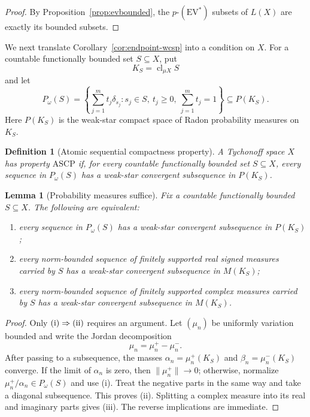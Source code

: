 \documentclass[11pt]{article}
\newtheorem{lemma}[theorem]{Lemma}
\newtheorem{definition}[theorem]{Definition}
\newcommand{\cl}{\operatorname{cl}}
\newcommand{\EV}{\mathrm{EV}}
\newcommand{\ASCP}{\mathrm{ASCP}}
\newcommand{\Pin}{P_{\!\omega}}
\begin{document}
\begin{proof}
By Proposition~\ref{prop:evbounded}, the $p$-$(\EV^*)$ subsets of $L(X)$ are
exactly its bounded subsets.
\end{proof}

We next translate Corollary~\ref{cor:endpoint-wcsp} into a condition on $X$.
For a countable functionally bounded set $S\subseteq X$, put
\[
  K_S=\cl_{\mu X}S
\]
and let
\[
  \Pin(S)=
  \left\{
    \sum_{j=1}^m t_j\delta_{s_j}:
    s_j\in S,\ t_j\geq0,\ \sum_{j=1}^m t_j=1
  \right\}
  \subseteq P(K_S).
\]
Here $P(K_S)$ is the weak-star compact space of Radon probability measures on
$K_S$.

\begin{definition}[Atomic sequential compactness property]\label{def:ascp}
A Tychonoff space $X$ has property $\ASCP$ if, for every countable
functionally bounded set $S\subseteq X$, every sequence in $\Pin(S)$ has a
weak-star convergent subsequence in $P(K_S)$.
\end{definition}

\begin{lemma}[Probability measures suffice]\label{lem:probabilities}
Fix a countable functionally bounded $S\subseteq X$.  The following are
equivalent:
\begin{enumerate}[label=\textup{(\roman*)}]
\item every sequence in $\Pin(S)$ has a weak-star convergent subsequence in
$P(K_S)$;
\item every norm-bounded sequence of finitely supported real signed measures
carried by $S$ has a weak-star convergent subsequence in $M(K_S)$;
\item every norm-bounded sequence of finitely supported complex measures
carried by $S$ has a weak-star convergent subsequence in $M(K_S)$.
\end{enumerate}
\end{lemma}

\begin{proof}
Only \(\textup{(i)}\Rightarrow\textup{(ii)}\) requires an argument.  Let $(\mu_n)$ be uniformly
variation bounded and write the Jordan decomposition
\[
  \mu_n=\mu_n^+-\mu_n^-.
\]
After passing to a subsequence, the masses
$\alpha_n=\mu_n^+(K_S)$ and $\beta_n=\mu_n^-(K_S)$ converge.  If the limit of
$\alpha_n$ is zero, then $\|\mu_n^+\|\to0$; otherwise, normalize
$\mu_n^+/\alpha_n\in\Pin(S)$ and use (i).  Treat the negative parts in the same
way and take a diagonal subsequence.  This proves (ii).  Splitting a complex
measure into its real and imaginary parts gives (iii).  The reverse implications
are immediate.
\end{proof}
\end{document}
